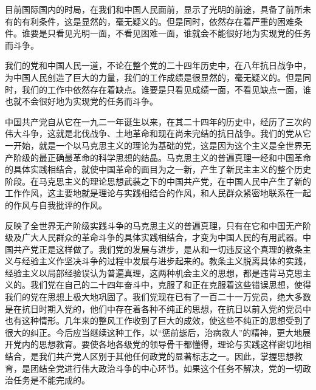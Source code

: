 目前国际国内的时局，在我们和中国人民面前，显示了光明的前途，具备了前所未有的有利条件，这是显然的，毫无疑义的。但是同时，依然存在着严重的困难条件。谁要是只看见光明一面，不看见困难一面，谁就会不能很好地为实现党的任务而斗争。

我们的党和中国人民一道，不论在整个党的二十四年历史中，在八年抗日战争中，为中国人民创造了巨大的力量，我们的工作成绩是很显然的，毫无疑义的。但是同时，我们的工作中依然存在着缺点。谁要是只看见成绩一面，不看见缺点一面，谁也就不会很好地为实现党的任务而斗争。

中国共产党自从它在一九二一年诞生以来，在其二十四年的历史中，经历了三次的伟大斗争，这就是北伐战争、土地革命和现在尚未完结的抗日战争。我们的党从它一开始，就是一个以马克思主义的理论为基础的党，这是因为这个主义是全世界无产阶级的最正确最革命的科学思想的结晶。马克思主义的普遍真理一经和中国革命的具体实践相结合，就使中国革命的面目为之一新，产生了新民主主义的整个历史阶段。在马克思主义的理论思想武装之下的中国共产党，在中国人民中产生了新的工作作风，这主要地就是理论与实践相结合的作风，和人民群众紧密地联系在一起的作风与自我批评的作风。

反映了全世界无产阶级实践斗争的马克思主义的普遍真理，只有在它和中国无产阶级及广大人民群众的革命斗争的具体实践相结合，才变为中国人民的有用武器。中国共产党正是这样做了。我们党的发展与进步，是从和一切违反这个真理的教条主义与经验主义作坚决斗争的过程中发展与进步起来的。教条主义脱离具体的实践，经验主义以局部经验误认为普遍真理，这两种机会主义的思想，都是违背马克思主义的。我们党在自己的二十四年奋斗中，克服了和正在克服着这些错误思想，使得我们的党在思想上极大地巩固了。我们党现在已有了一百二十一万党员，绝大多数是在抗日时期入党的，他们中存在着各种不纯正的思想，在抗日以前入党的党员中也有这种情形。几年来的整风工作收到了巨大的成效，使这些不纯正的思想受到了很大的纠正。今后应当继续这种工作，以“惩前毖后，治病救人”的精神，更大地展开党内的思想教育。要使各地各级党的领导骨干都懂得，理论与实践这样密切地相结合，是我们共产党人区别于其他任何政党的显著标志之一。因此，掌握思想教育，是团结全党进行伟大政治斗争的中心环节。如果这个任务不解决，党的一切政治任务是不能完成的。

